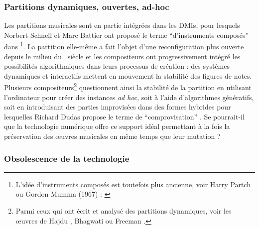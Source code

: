 \subsubsection{Partitions dynamiques, ouvertes, ad-hoc}
\label{sec:ephemeral:longevity_stability:dynamic_scores}

\noindent Les partitions musicales sont en partie intégrées dans les \glspl{DMI}, pour lesquels Norbert Schnell et Marc Battier ont proposé le terme ``d'instruments composés'' dans \cite{schnell_introducing_2002}\footnote{L'idée d'instruments composés est toutefois plus ancienne, voir Harry Partch ou Gordon Mumma (1967) : \cite{mumma_creative_1967}}. La partition elle-même a fait l'objet d'une reconfiguration plus ouverte depuis le milieu du ~siècle et les compositeurs ont progressivement intégré les possibilités algorithmiques dans leurs processus de création : des systèmes dynamiques et interactifs mettent en mouvement la stabilité des figures de notes. Plusieurs compositeurs\footnote{Parmi ceux qui ont écrit et analysé des partitions dynamiques, voir les œuvres de Hajdu \cite{hajdu_disposable_2016}, Bhagwati \cite{bhagwati_vexations_2017} ou Freeman \cite{freeman_extreme_2008}.} questionnent ainsi la stabilité de la partition en utilisant l'ordinateur pour créer des instances \textit{ad hoc}, soit à l'aide d'algorithmes génératifs, soit en introduisant des parties improvisées dans des formes hybrides pour lesquelles Richard Dudas propose le terme de ``comprovisation'' \cite{dudas_comprovisation:_2010}. Se pourrait-il que la technologie numérique offre ce support idéal permettant à la fois la préservation des œuvres musicales en même temps que leur mutation ?

\subsubsection{Obsolescence de la technologie}

